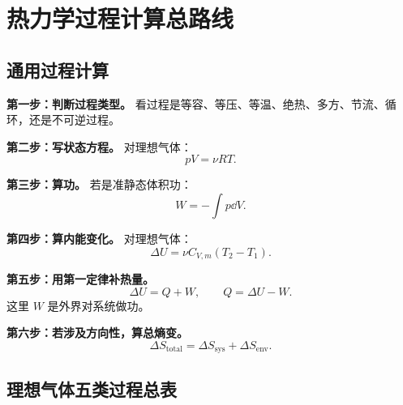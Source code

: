 \section{热力学过程计算总路线}

\subsection{通用过程计算}

\begin{MethodBox}
\begin{ReviewList}
  \item \textbf{第一步：判断过程类型。}
  看过程是等容、等压、等温、绝热、多方、节流、循环，还是不可逆过程。

  \item \textbf{第二步：写状态方程。}
  对理想气体：
  \[
    pV=\nu RT.
  \]

  \item \textbf{第三步：算功。}
  若是准静态体积功：
  \[
    W=-\int p\dd V.
  \]

  \item \textbf{第四步：算内能变化。}
  对理想气体：
  \[
    \Delta U=\nu C_{V,m}(T_2-T_1).
  \]

  \item \textbf{第五步：用第一定律补热量。}
  \[
    \Delta U=Q+W,
    \qquad
    Q=\Delta U-W.
  \]
  这里 \(W\) 是外界对系统做功。

  \item \textbf{第六步：若涉及方向性，算总熵变。}
  \[
    \Delta S_{\mathrm{total}}
    =
    \Delta S_{\mathrm{sys}}+\Delta S_{\mathrm{env}}.
  \]
\end{ReviewList}
\end{MethodBox}

\subsection{理想气体五类过程总表}

